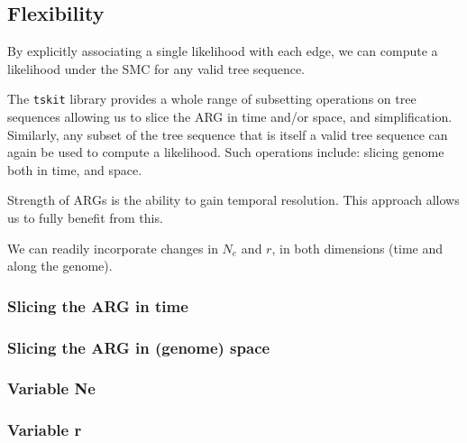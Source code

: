 \documentclass{article}
\begin{document}


\subsection{Flexibility}

By explicitly associating a single likelihood with each edge, we can compute a likelihood 
under the SMC for any valid tree sequence. 

The \texttt{tskit} library provides a whole range  
of subsetting operations on tree sequences allowing us to slice the ARG in time and/or space, 
and simplification.
Similarly, any subset of the tree sequence that is itself a valid tree sequence can again 
be used to compute a likelihood. Such operations include: slicing genome both in time, and space.

Strength of ARGs is the ability to gain temporal resolution. This approach allows us to fully 
benefit from this.

We can readily incorporate changes in $N_e$ and $r$, in both dimensions (time and along the genome).

\subsubsection{Slicing the ARG in time}

\subsubsection{Slicing the ARG in (genome) space}

\subsubsection{Variable Ne}

\subsubsection{Variable r}


\end{document}
